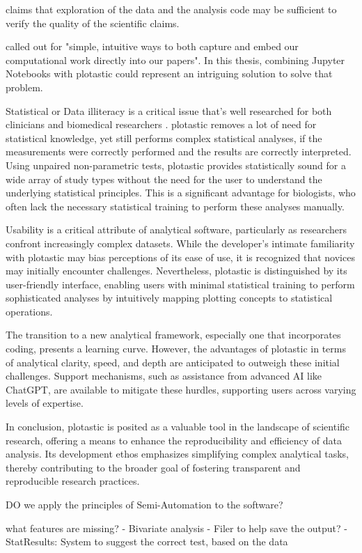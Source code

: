 \citet{pengReproducibleResearchComputational2011} claims that exploration of the
data and the analysis code may be sufficient to verify the quality of the
scientific claims.

\citet{mesirovAccessibleReproducibleResearch2010} called out for "simple,
intuitive ways to both capture and embed our computational work directly into
our papers". In this thesis, combining Jupyter Notebooks with plotastic could
represent an intriguing solution to solve that problem.

Statistical or Data illiteracy is a critical issue that's well researched for both clinicians and
biomedical researchers \cite{lakhlifiIllusionKnowledgeStatistics2023,federerDataLiteracyTraining2016}.
plotastic removes a lot of need for statistical knowledge, yet still performs complex statistical analyses,
if the measurements were correctly performed and the results are correctly interpreted.
Using unpaired non-parametric tests, plotastic provides statistically sound for a wide array of study types without
the need for the user to understand the underlying statistical principles. This is a significant advantage for
biologists, who often lack the necessary statistical training to perform these analyses manually.

Usability is a critical attribute of analytical software, particularly as
researchers confront increasingly complex datasets. While the developer's
intimate familiarity with plotastic may bias perceptions of its ease of use, it
is recognized that novices may initially encounter challenges. Nevertheless,
plotastic is distinguished by its user-friendly interface, enabling users with
minimal statistical training to perform sophisticated analyses by intuitively
mapping plotting concepts to statistical operations.

The transition to a new analytical framework, especially one that incorporates
coding, presents a learning curve. However, the advantages of plotastic in terms
of analytical clarity, speed, and depth are anticipated to outweigh these
initial challenges. Support mechanisms, such as assistance from advanced AI like
ChatGPT, are available to mitigate these hurdles, supporting users across
varying levels of expertise.

In conclusion, plotastic is posited as a valuable tool in the landscape of
scientific research, offering a means to enhance the reproducibility and
efficiency of data analysis. Its development ethos emphasizes simplifying
complex analytical tasks, thereby contributing to the broader goal of fostering
transparent and reproducible research practices.


DO we apply the principles of Semi-Automation to the software?

what features are missing?
- Bivariate analysis
- Filer to help save the output?
- StatResults: System to suggest the correct test, based on the data
